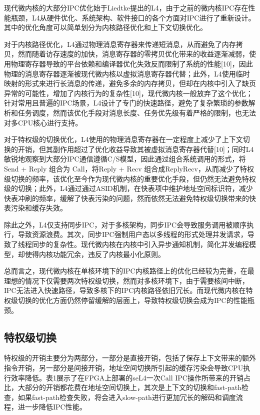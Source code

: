 现代微内核的大部分IPC优化始于Liedtke提出的L4，由于之前的微内核IPC存在性能瓶颈，L4从硬件优化、系统架构、软件接口的各个方面对IPC进行了重新设计。其中的优化角度可以简单划分为内核路径优化和上下文切换优化。

对于内核路径优化，L4通过物理消息寄存器来传递短消息，从而避免了内存拷贝，然而随着访存速度的加快，消息寄存器的零拷贝优化带来的收益逐渐减弱，使用物理寄存器导致的平台依赖和编译器优化失效反而限制了系统的性能[10]，因此物理的消息寄存器逐渐被现代微内核以虚拟消息寄存器代替；此外，L4使用临时映射的形式来进行长消息的传递，避免多余的内存拷贝，但却在内核中引入了缺页异常的可能性，增加了内核行为的复杂性[10]，现代微内核一般放弃了这个优化；针对常用且普遍的IPC场景，L4设计了专门的快速路径，避免了复杂繁琐的参数解析和任务调度，然而该优化手段对消息长度、任务优先级有着严格的限制，也无法对多CPU核心进行支持。

对于特权级的切换优化，L4使用的物理消息寄存器在一定程度上减少了上下文切换的开销，但其副作用超过了优化收益导致其被虚拟消息寄存器代替[10]；同时L4敏锐地观察到大部分IPC通信遵循C/S模型，因此通过组合系统调用的形式，将Send + Reply 组合为 Call，将Reply + Recv 组合成ReplyRecv，从而减少了特权级切换的频率，该优化至今作为现代微内核的重要优化手段，但仍然无法避免特权级的切换；此外，L4通过通过ASID机制，在快表项中维护地址空间标识符，减少快表冲刷的频率，缓解了快表污染的问题，然而依然无法避免特权级切换带来的快表污染和缓存失效。

除此之外，L4仅支持同步IPC，对于多核架构，同步IPC会导致服务调用被顺序执行，导致资源浪费。其次，同步IPC强制用户态以多线程的形式处理并发请求，导致了线程同步的复杂性。现代微内核在内核中引入异步通知机制，简化并发编程模型，却使得内核功能冗余，违反了内核最小化原则。

总而言之，现代微内核在单核环境下的IPC内核路径上的优化已经较为完善，在最理想的情况下仅需要两次特权级切换，然而对多核环境下，由于需要核间中断，IPC无法进入快速路径，导致多核下的IPC内核路径依旧冗长。而现代微内核在特权级切换的优化方面仍然停留缓解的层面上，导致特权级切换会成为IPC的性能瓶颈。


\subsection{特权级切换}
特权级的开销主要分为两部分，一部分是直接开销，包括了保存上下文带来的额外指令开销，另一部分是间接开销，地址空间切换所引起的缓存污染会导致CPU执行效率降低。表1展示了在FPGA上部署的seL4一次Call IPC操作所带来的开销占比，大部分的开销都花费在地址空间切换上，其次是上下文的切换和fast-path检查，如果fast-path检查失败，将会进入slow-path进行更加冗长的解码和调度流程，进一步降低IPC性能。

